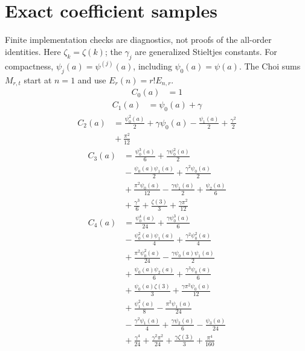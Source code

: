 \section*{Exact coefficient samples}
Finite implementation checks are diagnostics, not proofs of the all-order identities.
Here $\zeta_k=\zeta(k)$; the $\gamma_j$ are generalized Stieltjes constants.
For compactness, $\psi_j(a)=\psi^{(j)}(a)$, including $\psi_0(a)=\psi(a)$.
The Choi sums $M_{r,t}$ start at $n=1$ and use $E_r(n)=r!E_{n,r}$.
\[
\begin{aligned}
C_{0}(a) &={} 1
\end{aligned}
\]
\[
\begin{aligned}
C_{1}(a) &={} \psi_{0}{\left(a \right)} + \gamma
\end{aligned}
\]
\[
\begin{aligned}
C_{2}(a) &={} \frac{\psi_{0}^{2}{\left(a \right)}}{2} + \gamma \psi_{0}{\left(a \right)} - \frac{\psi_{1}{\left(a \right)}}{2} + \frac{\gamma^{2}}{2}\\
&{} + \frac{\pi^{2}}{12}
\end{aligned}
\]
\[
\begin{aligned}
C_{3}(a) &={} \frac{\psi_{0}^{3}{\left(a \right)}}{6} + \frac{\gamma \psi_{0}^{2}{\left(a \right)}}{2}\\
&{} - \frac{\psi_{0}{\left(a \right)} \psi_{1}{\left(a \right)}}{2} + \frac{\gamma^{2} \psi_{0}{\left(a \right)}}{2}\\
&{} + \frac{\pi^{2} \psi_{0}{\left(a \right)}}{12} - \frac{\gamma \psi_{1}{\left(a \right)}}{2} + \frac{\psi_{2}{\left(a \right)}}{6}\\
&{} + \frac{\gamma^{3}}{6} + \frac{\zeta\left(3\right)}{3} + \frac{\gamma \pi^{2}}{12}
\end{aligned}
\]
\[
\begin{aligned}
C_{4}(a) &={} \frac{\psi_{0}^{4}{\left(a \right)}}{24} + \frac{\gamma \psi_{0}^{3}{\left(a \right)}}{6}\\
&{} - \frac{\psi_{0}^{2}{\left(a \right)} \psi_{1}{\left(a \right)}}{4} + \frac{\gamma^{2} \psi_{0}^{2}{\left(a \right)}}{4}\\
&{} + \frac{\pi^{2} \psi_{0}^{2}{\left(a \right)}}{24} - \frac{\gamma \psi_{0}{\left(a \right)} \psi_{1}{\left(a \right)}}{2}\\
&{} + \frac{\psi_{0}{\left(a \right)} \psi_{2}{\left(a \right)}}{6} + \frac{\gamma^{3} \psi_{0}{\left(a \right)}}{6}\\
&{} + \frac{\psi_{0}{\left(a \right)} \zeta\left(3\right)}{3} + \frac{\gamma \pi^{2} \psi_{0}{\left(a \right)}}{12}\\
&{} + \frac{\psi_{1}^{2}{\left(a \right)}}{8} - \frac{\pi^{2} \psi_{1}{\left(a \right)}}{24}\\
&{} - \frac{\gamma^{2} \psi_{1}{\left(a \right)}}{4} + \frac{\gamma \psi_{2}{\left(a \right)}}{6} - \frac{\psi_{3}{\left(a \right)}}{24}\\
&{} + \frac{\gamma^{4}}{24} + \frac{\gamma^{2} \pi^{2}}{24} + \frac{\gamma \zeta\left(3\right)}{3} + \frac{\pi^{4}}{160}
\end{aligned}
\]
